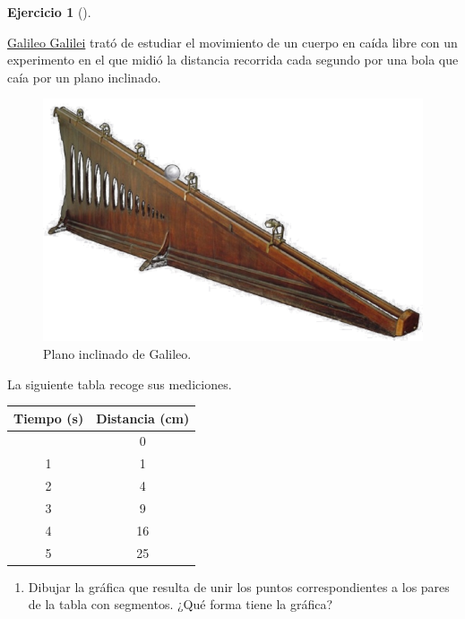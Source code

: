 \documentclass[
  a4paper,
]{scrreport}
\theoremstyle{definition}
\newtheorem{exercise}{Ejercicio}[chapter]
\theoremstyle{remark}
\begin{document}
\begin{exercise}[]\protect\hypertarget{exr-tasa-variacion}{}\label{exr-tasa-variacion}

\href{https://en.wikipedia.org/wiki/Galileo_Galilei}{Galileo Galilei}
trató de estudiar el movimiento de un cuerpo en caída libre con un
experimento en el que midió la distancia recorrida cada segundo por una
bola que caía por un plano inclinado.

\begin{figure}

{\centering \includegraphics{img/derivadas/plano-inclinado.png}

}

\caption{Plano inclinado de Galileo.}

\end{figure}

La siguiente tabla recoge sus mediciones.

\begin{longtable}[]{@{}cc@{}}
\toprule\noalign{}
Tiempo (s) & Distancia (cm) \\
\midrule\noalign{}
\endhead
\bottomrule\noalign{}
\endlastfoot
0 & 0 \\
1 & 1 \\
2 & 4 \\
3 & 9 \\
4 & 16 \\
5 & 25 \\
\end{longtable}

\begin{enumerate}
\def\labelenumi{\alph{enumi}.}
\item
  Dibujar la gráfica que resulta de unir los puntos correspondientes a
  los pares de la tabla con segmentos. ¿Qué forma tiene la gráfica?


\end{enumerate}
\end{exercise}
\end{document}

